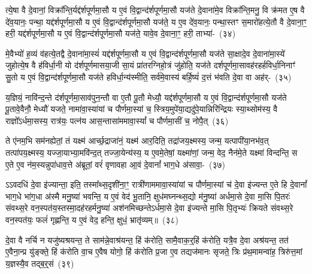 त्ये॒षा वै दे॒वानां॒ विक्रा᳚न्ति॒र्यद्द॑र्\mbox{}श\-पूर्ण\-मा॒सौ य ए॒वं वि॒द्वान्द॑र्\mbox{}शपूर्णमा॒सौ यज॑ते दे॒वाना॑मे॒व विक्रा᳚न्ति॒मनु॒ वि क्र॑मत ए॒ष वै दे॑व॒यानः॒ पन्था॒ यद्द॑र्\mbox{}श\-पूर्ण\-मा॒सौ य ए॒वं वि॒द्वान्द॑र्\mbox{}शपूर्णमा॒सौ यज॑ते॒ य ए॒व दे॑व॒यानः॒ पन्था॒स्तꣳ स॒मारो॑हत्ये॒तौ वै दे॒वाना॒ꣳ॒ हरी॒ यद्द॑र्\mbox{}श\-पूर्ण\-मा॒सौ य ए॒वं वि॒द्वान्द॑र्\mbox{}शपूर्णमा॒सौ यज॑ते॒ यावे॒व दे॒वाना॒ꣳ॒ हरी॒ ताभ्या॑-~(३४)\ip

मे॒वैभ्यो॑ ह॒व्यं व॑हत्ये॒तद्वै दे॒वाना॑मा॒स्यं॑ यद्द॑र्\mbox{}श\-पूर्ण\-मा॒सौ य ए॒वं वि॒द्वान्द॑र्\mbox{}शपूर्णमा॒सौ यज॑ते सा॒क्षादे॒व दे॒वाना॑मा॒स्ये॑ जुहोत्ये॒ष वै ह॑विर्धा॒नी यो द॑र्\mbox{}शपूर्णमासया॒जी सा॒यं प्रा॑तरग्निहो॒त्रं जु॑होति॒ यज॑ते दर्\mbox{}श\-पूर्ण\-मा॒सावह॑रहर्\mbox{}हविर्धा॒निनाꣳ॑ सु॒तो य ए॒वं वि॒द्वान्द॑र्\mbox{}शपूर्णमा॒सौ यज॑ते हविर्धा॒न्य॑स्मीति॒ सर्व॑मे॒वास्य॑ बर्\mbox{}हि॒ष्यं॑ द॒त्तं भ॑वति दे॒वा वा अह॑र्-~(३५)\ip

य॒ज्ञियं॒ नावि॑न्द॒न्ते द॑र्\mbox{}शपूर्णमा॒साव॑पुन॒न्तौ वा ए॒तौ पू॒तौ मेध्यौ॒ यद्द॑र्\mbox{}श\-पूर्ण\-मा॒सौ य ए॒वं वि॒द्वान्द॑र्\mbox{}शपूर्णमा॒सौ यज॑ते पू॒तावे॒वैनौ॒ मेध्यौ॑ यजते॒ नामा॑वा॒स्या॑यां च पौर्णमा॒स्यां च॒ स्त्रिय॒मुपे॑या॒द्यदु॑पे॒यान्निरि॑न्द्रियः स्या॒थ्सोम॑स्य॒ वै राज्ञो᳚\-ऽर्धमा॒सस्य॒ रात्र॑यः॒ पत्न॑य आस॒न्तासा॑ममावा॒स्यां᳚ च पौर्णमा॒सीं च॒ नोपै॒त्~(३६)\ip

ते ए॑नम॒भि सम॑नह्येतां॒ तं यक्ष्म॑ आर्च्छ॒द्राजा॑नं॒ यक्ष्म॑ आर॒दिति॒ तद्रा॑जय॒क्ष्मस्य॒ जन्म॒ यत्पापी॑या॒नभ॑व॒त् त\-त्पा॑पय॒क्ष्मस्य॒ यज्जा॒याभ्या॒मवि॑न्द॒त् तज्जा॒येन्य॑स्य॒ य ए॒वमे॒तेषां॒ यक्ष्मा॑णां॒ जन्म॒ वेद॒ नैन॑मे॒ते यक्ष्मा॑ विन्दन्ति॒ स ए॒ते ए॒व न॑म॒स्यन्नुपा॑धाव॒त्ते अ॑ब्रूतां॒ वरं॑ वृणावहा आ॒वं दे॒वानां᳚ भाग॒\-धे अ॑सावा॒-~(३७)\ip

ऽऽवदधि॑ दे॒वा इ॑ज्यान्ता॒ इति॒ तस्मा᳚थ्स॒दृशी॑ना॒ꣳ॒ रात्री॑णाममावा॒स्या॑यां च पौर्णमा॒स्यां च॑ दे॒वा इ॑ज्यन्त ए॒ते हि दे॒वानां᳚ भाग॒\-धे भा॑ग॒धा अ॑स्मै मनु॒ष्या॑ भवन्ति॒ य ए॒वं वेद॑ भू॒तानि॒ क्षुध॑मघ्नन्थ्स॒द्यो म॑नु॒ष्या॑ अर्धमा॒से दे॒वा मा॒सि पि॒तरः॑ संवथ्स॒रे वन॒स्पत॑य॒स्तस्मा॒दह॑रहर्मनु॒ष्या॑ अश॑नमिच्छन्ते\-ऽर्धमा॒से दे॒वा इ॑ज्यन्ते मा॒सि पि॒तृभ्यः॑ क्रियते संवथ्स॒रे वन॒स्पत॑यः॒ फलं॑ गृह्णन्ति॒ य ए॒वं वेद॒ हन्ति॒ क्षुधं॒ भ्रातृ॑व्यम्॥~(३८)\ip

{\anuvakamend[{प॒श्य॒ति॒ ताभ्या॒मह॑रैदसाव॒ फलꣳ॑ स॒प्त च॑}]}

दे॒वा वै नर्चि न यजु॑ष्यश्रयन्त॒ ते साम॑न्ने॒वाश्र॑यन्त॒ हिं क॑रोति॒ सामै॒वाक॒र्॒\mbox{}हिं क॑रोति॒ यत्रै॒व दे॒वा अश्र॑यन्त॒ तत॑ ए॒वैना॒न्प्र यु॑ङ्क्ते॒ हिं क॑रोति वा॒च ए॒वैष योगो॒ हिं क॑रोति प्र॒जा ए॒व तद्यज॑मानः सृजते॒ त्रिः प्र॑थ॒मामन्वा॑ह॒ त्रिरु॑त्त॒मां य॒ज्ञस्यै॒व तद्ब॒र्॒\mbox{}सं~(३९)\ip

